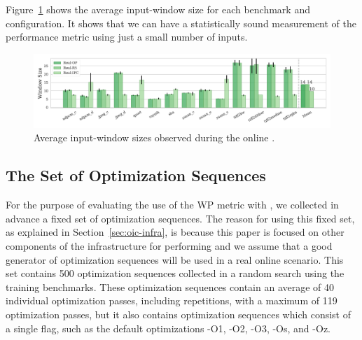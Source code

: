 Figure~\ref{fig:window-size} shows the average input-window size for each benchmark and configuration.
It shows that we can have a statistically sound measurement of the performance metric using just a small number of inputs.

\begin{figure}[htb]
    \centering
    \includegraphics[width=\textwidth]{figs/window-size.pdf}
    \caption{Average input-window sizes observed during the online {\itercomp}.}
    \label{fig:window-size}
\end{figure}

\subsection{The Set of Optimization Sequences}

For the purpose of evaluating the use of the WP metric with {\itercomp}, we collected in advance a fixed set of optimization sequences.
The reason for using this fixed set, as explained in Section~\ref{sec:oic-infra}, is because this paper is focused on other components of the infrastructure for performing {\itercomp} and we assume that a good generator of optimization sequences will be used in a real online scenario.
This set contains 500 optimization sequences collected in a random search using the training benchmarks.
These optimization sequences contain an average of 40 individual optimization passes, including repetitions, with a maximum of 119 optimization passes, but it also contains optimization sequences which consist of a single flag, such as the default optimizations {\flagstype -O1}, {\flagstype -O2}, {\flagstype -O3}, {\flagstype -Os}, and {\flagstype -Oz}.

